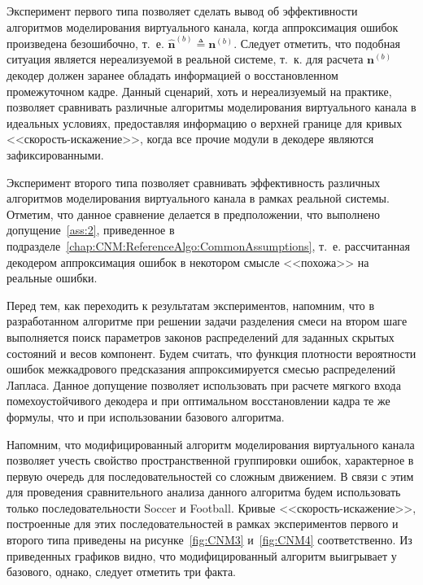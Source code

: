 Эксперимент первого типа позволяет сделать вывод об эффективности алгоритмов моделирования виртуального канала, когда аппроксимация ошибок произведена безошибочно, т.~е. $\hat{\mathbf{n}}^{(b)} \triangleq \mathbf{n}^{(b)}$. Следует отметить, что подобная ситуация является нереализуемой в реальной системе, т.~к. для расчета $\mathbf{n}^{(b)}$ декодер должен заранее обладать информацией о восстановленном промежуточном кадре. Данный сценарий, хоть и нереализуемый на практике, позволяет сравнивать различные алгоритмы моделирования виртуального канала в идеальных условиях, предоставляя информацию о верхней границе для кривых <<скорость-искажение>>, когда все прочие модули в декодере являются зафиксированными.

Эксперимент второго типа позволяет сравнивать эффективность различных алгоритмов моделирования виртуального канала в рамках реальной системы. Отметим, что данное сравнение делается в предположении, что выполнено допущение~\ref{ass:2}, приведенное в подразделе~\ref{chap:CNM:ReferenceAlgo:CommonAssumptions}, т.~е. рассчитанная декодером аппроксимация ошибок в некотором смысле <<похожа>> на реальные ошибки.

Перед тем, как переходить к результатам экспериментов, напомним, что в разработанном алгоритме при решении задачи разделения смеси на втором шаге выполняется поиск параметров законов распределений для заданных скрытых состояний и весов компонент. Будем считать, что функция плотности вероятности ошибок межкадрового предсказания аппроксимируется смесью распределений Лапласа. Данное допущение позволяет использовать при расчете мягкого входа помехоустойчивого декодера и при оптимальном восстановлении кадра те же формулы, что и при использовании базового алгоритма.

Напомним, что модифицированный алгоритм моделирования виртуального канала позволяет учесть свойство пространственной группировки ошибок, характерное в первую очередь для последовательностей со сложным движением. В связи с этим для проведения сравнительного анализа данного алгоритма будем использовать только последовательности Soccer и Football. Кривые <<скорость-искажение>>, построенные для этих последовательностей в рамках экспериментов первого и второго типа приведены на рисунке~\ref{fig:CNM3} и~\ref{fig:CNM4} соответственно. Из приведенных графиков видно, что модифицированный алгоритм выигрывает у базового, однако, следует отметить три факта.

